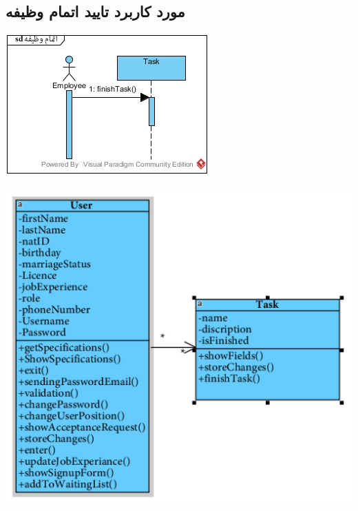 \subsection*{مورد کاربرد تایید اتمام وظیفه}
\vspace{2cm}
\begin{center}
\includegraphics[width=\textwidth]{SequenceDiagrams/30.jpg}
\end{center}

\newpage
\vspace{2cm}
\begin{center}
\includegraphics[width=\textwidth]{SequenceClasses/30.png}
\end{center}

